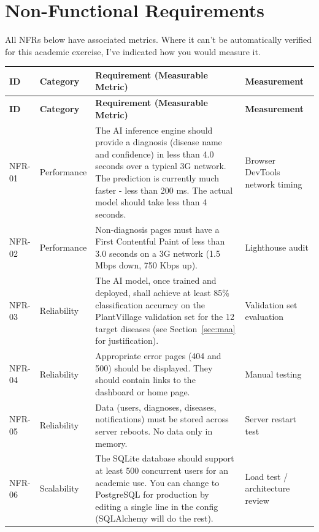 \documentclass[12pt,a4paper]{article}
\begin{document}
\section{Non-Functional Requirements}

All NFRs below have associated metrics. Where it can't be automatically verified for this academic exercise, I've indicated how you would measure it.

\begin{longtable}{|p{1.3cm}|p{2.3cm}|p{8cm}|p{2.5cm}|}
\hline
\rowcolor{lightgreen}
\textbf{ID} & \textbf{Category} & \textbf{Requirement (Measurable Metric)} & \textbf{Measurement} \\
\hline
\endfirsthead
\hline
\rowcolor{lightgreen}
\textbf{ID} & \textbf{Category} & \textbf{Requirement (Measurable Metric)} & \textbf{Measurement} \\
\hline
\endhead

NFR-01 & Performance &
The AI inference engine should provide a diagnosis (disease name and confidence) in less than 4.0 seconds over a typical 3G network. The prediction is currently much faster - less than 200 ms. The actual model should take less than 4 seconds. &
Browser DevTools network timing \\
\hline

NFR-02 & Performance &
Non-diagnosis pages must have a First Contentful Paint of less than 3.0 seconds on a 3G network (1.5 Mbps down, 750 Kbps up). &
Lighthouse audit \\
\hline

NFR-03 & Reliability &
The AI model, once trained and deployed, shall achieve at least 85\% classification accuracy on the PlantVillage validation set for the 12 target diseases (see Section~\ref{sec:maa} for justification). &
Validation set evaluation \\
\hline

NFR-04 & Reliability &
Appropriate error pages (404 and 500) should be displayed. They should contain links to the dashboard or home page. &
Manual testing \\
\hline

NFR-05 & Reliability &
Data (users, diagnoses, diseases, notifications) must be stored across server reboots. No data only in memory. &
Server restart test \\
\hline

NFR-06 & Scalability &
The SQLite database should support at least 500 concurrent users for an academic use. You can change to PostgreSQL for production by editing a single line in the config (SQLAlchemy will do the rest). &
Load test / architecture review \\
\hline


\end{longtable}
\end{document}

